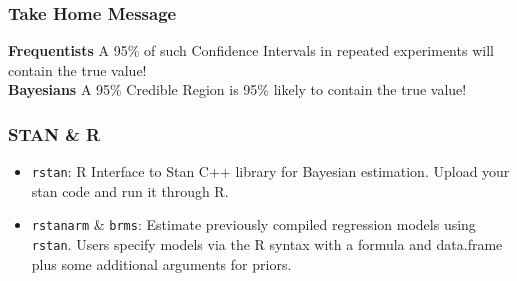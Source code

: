 \documentclass[handout]{beamer}\usepackage[]{graphicx}\usepackage[]{color}
\begin{document}

\begin{frame}
\frametitle{Take Home Message}

\textbf{Frequentists}
A 95\% of such Confidence Intervals in repeated experiments will contain the true value! \\
\vskip 1cm
\pause
\textbf{Bayesians}
A 95\% Credible Region is 95\% likely to contain the true value! \\
\end{frame}






\begin{frame}
\frametitle{STAN \& R}
\pause
\begin{itemize}
\item \texttt{rstan}: R Interface to Stan C++ library for Bayesian estimation. Upload your stan code and run it through R. %
\vskip 1cm
\pause
\item \texttt{rstanarm} \& \texttt{brms}:  Estimate previously compiled regression models using \texttt{rstan}. Users specify models via the R syntax with a formula and data.frame plus some additional arguments for priors.  

\end{itemize}

\end{frame}
 
\end{document}
